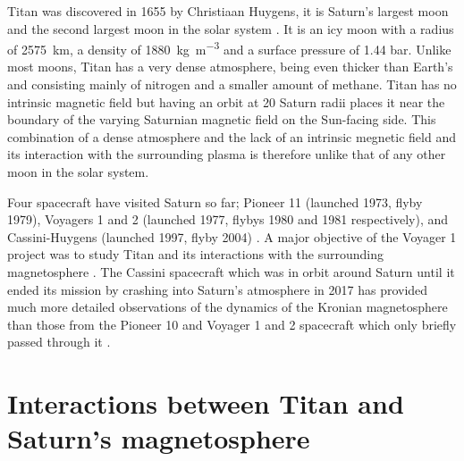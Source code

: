 \documentclass[12pt, parskip=full*, abstract]{scrartcl}
\begin{document}
Titan was discovered in 1655 by Christiaan Huygens, it is Saturn's largest moon and the second largest moon in the solar system \parencite{fundamental-planetary-science}. It is an icy moon with a radius of \SI{2575}{\kilo\metre}, a density of \SI{1880}{\kilogram\per\metre^3} and a surface pressure of 1.44 bar. Unlike most moons, Titan has a very dense atmosphere, being even thicker than Earth's and consisting mainly of nitrogen and a smaller amount of methane. Titan has no intrinsic magnetic field but having an orbit at 20 Saturn radii places it near the boundary of the varying Saturnian magnetic field on the Sun-facing side. This combination of a dense atmosphere and the lack of an intrinsic megnetic field and its interaction with the surrounding plasma is therefore unlike that of any other moon in the solar system. 

Four spacecraft have visited Saturn so far; Pioneer 11 (launched 1973, flyby 1979), Voyagers 1 and 2 (launched 1977, flybys 1980 and 1981 respectively), and Cassini-Huygens (launched 1997, flyby 2004) \parencite{encyclopedia-missions}. A major objective of the Voyager 1 project was to study Titan and its interactions with the surrounding magnetosphere \parencite{hartle-1982}. The Cassini spacecraft which was in orbit around Saturn until it ended its mission by crashing into Saturn's atmosphere in 2017 \parencite{cassini-2019} has provided much more detailed observations of the dynamics of the Kronian magnetosphere than those from the Pioneer 10 and Voyager 1 and 2 spacecraft which only briefly passed through it \parencite{encyclopedia-magnetospheres}. 


\section{Interactions between Titan and Saturn's magnetosphere}
\end{document}
